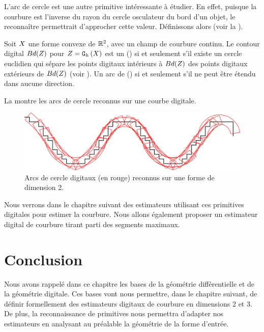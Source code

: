 L'arc de cercle est une autre primitive intéressante à étudier. En effet,
puisque la courbure est l'inverse du rayon du cercle osculateur du bord d'un
objet, le reconnaître permettrait d'approcher cette valeur. Définissons alors
 (voir la ).
%
\begin{definition}{}
  \label{def:digital-circular-arc}
  Soit $X$ une forme convexe de $\mathbb{R}^2$, avec un champ de courbure continu.
  Le contour digital $Bd({Z})$ pour $Z = \mathtt{G}_{h}\left(X\right)$ est un
   () si et seulement s'il existe
  un cercle euclidien qui sépare les points digitaux intérieurs à
  $Bd({Z})$ des points digitaux extérieurs de $Bd({Z})$ (voir
  ). Un arc de 
  () si et seulement s'il ne peut être étendu dans aucune
  direction.
\end{definition}

La  montre les arcs de cercle reconnus sur une courbe
digitale.


\begin{figure}[ht]{
    \begin{center}
    \includegraphics[width=13cm]{images/Notions/DCA2}
    \end{center}}
    \caption[Arcs de cercle digitaux reconnus.]{Arcs de cercle digitaux (en rouge) reconnus sur une forme de dimension 2.\label{fig:dca-figure2}}
\end{figure}


Nous verrons dans le chapitre suivant des estimateurs utilisant ces primitives
digitales pour estimer la courbure. Nous allons également proposer un estimateur
digital de courbure tirant parti des segments maximaux.
%
\section{Conclusion}
%
Nous avons rappelé dans ce chapitre les bases de la géométrie différentielle et de
la géométrie digitale.  Ces bases vont nous permettre, dans le chapitre suivant,
de définir formellement des estimateurs digitaux de courbure en dimensions 2 et
3. De plus, la reconnaissance de primitives nous permettra d'adapter nos
estimateurs en analysant au préalable la géométrie de la forme d'entrée.
